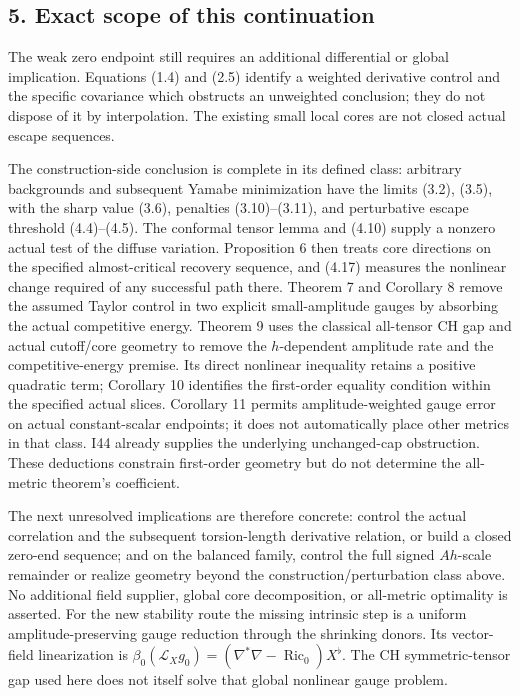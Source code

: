 \documentclass[
  11pt,
]{article}
\begin{document}
\hypertarget{exact-scope-of-this-continuation}{%
\subsection{5. Exact scope of this
continuation}\label{exact-scope-of-this-continuation}}

The weak zero endpoint still requires an additional differential or
global implication. Equations (1.4) and (2.5) identify a weighted
derivative control and the specific covariance which obstructs an
unweighted conclusion; they do not dispose of it by interpolation. The
existing small local cores are not closed actual escape sequences.

The construction-side conclusion is complete in its defined class:
arbitrary backgrounds and subsequent Yamabe minimization have the limits
(3.2), (3.5), with the sharp value (3.6), penalties (3.10)--(3.11), and
perturbative escape threshold (4.4)--(4.5). The conformal tensor lemma
and (4.10) supply a nonzero actual test of the diffuse variation.
Proposition 6 then treats core directions on the specified
almost-critical recovery sequence, and (4.17) measures the nonlinear
change required of any successful path there. Theorem 7 and Corollary 8
remove the assumed Taylor control in two explicit small-amplitude gauges
by absorbing the actual competitive energy. Theorem 9 uses the classical
all-tensor CH gap and actual cutoff/core geometry to remove the
\(h\)-dependent amplitude rate and the competitive-energy premise. Its
direct nonlinear inequality retains a positive quadratic term; Corollary
10 identifies the first-order equality condition within the specified
actual slices. Corollary 11 permits amplitude-weighted gauge error on
actual constant-scalar endpoints; it does not automatically place other
metrics in that class. I44 already supplies the underlying unchanged-cap
obstruction. These deductions constrain first-order geometry but do not
determine the all-metric theorem's coefficient.

The next unresolved implications are therefore concrete: control the
actual correlation and the subsequent torsion-length derivative
relation, or build a closed zero-end sequence; and on the balanced
family, control the full signed \(Ah\)-scale remainder or realize
geometry beyond the construction/perturbation class above. No additional
field supplier, global core decomposition, or all-metric optimality is
asserted. For the new stability route the missing intrinsic step is a
uniform amplitude-preserving gauge reduction through the shrinking
donors. Its vector-field linearization is
\(\beta_0(\mathcal L_Xg_0)=(\nabla^*\nabla-\operatorname{Ric}_0)X^\flat\).
The CH symmetric-tensor gap used here does not itself solve that global
nonlinear gauge problem.
\end{document}
